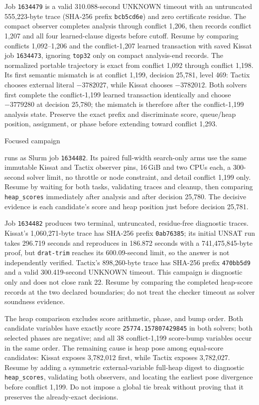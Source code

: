 \documentclass[11pt]{article}
\newcommand{\code}[1]{\texttt{#1}}
\newcommand{\artifact}[1]{\path{#1}}
\begin{document}
Job \code{1634479} is a valid 310.088-second UNKNOWN timeout with an
untruncated 555,223-byte trace (SHA-256 prefix \code{bcb5cd6e}) and zero
certificate residue. The compact observer completes analysis through conflict
1,206, then records conflict 1,207 and all four learned-clause digests before
cutoff. Resume by comparing conflicts 1,092--1,206 and the conflict-1,207
learned transaction with saved Kissat job \code{1634473}, ignoring
\code{top32} only on compact analysis-end records. The normalized portable
trajectory is exact from conflict 1,092 through conflict 1,198. Its first
semantic mismatch is at conflict 1,199, decision 25,781, level 469: Tactix
chooses external literal $-3782027$, while Kissat chooses $-3782012$. Both
solvers first complete the conflict-1,199 learned transaction identically and
choose $-3779280$ at decision 25,780; the mismatch is therefore after the
conflict-1,199 analysis state. Preserve the exact prefix and discriminate
score, queue/heap position, assignment, or phase before extending toward
conflict 1,293.

Focused campaign
\begin{center}\small\artifact{20260819-0640-tierd-rank22-c1199-heap}\end{center}
runs as Slurm job \code{1634482}. Its paired full-width search-only arms use the
same immutable Kissat and Tactix observer pins, 16\,GiB and two CPUs each, a
300-second solver limit, no throttle or node constraint, and detail conflict
1,199 only. Resume by waiting for both tasks, validating traces and cleanup,
then comparing \code{heap\_scores} immediately after analysis and after decision
25,780. The decisive evidence is each candidate's score and heap position just
before decision 25,781.

Job \code{1634482} produces two terminal, untruncated, residue-free diagnostic
traces. Kissat's 1,060,271-byte trace has SHA-256 prefix \code{0ab76385}; its
initial UNSAT run takes 296.719 seconds and reproduces in 186.872 seconds with a
741,475,845-byte proof, but \code{drat-trim} reaches its 600.09-second limit, so
the answer is not independently verified. Tactix's 898,260-byte trace has
SHA-256 prefix \code{470bb5d9} and a valid 300.419-second UNKNOWN timeout. This
campaign is diagnostic only and does not close rank 22. Resume by comparing the
completed heap-score records at the two declared boundaries; do not treat the
checker timeout as solver soundness evidence.

The heap comparison excludes score arithmetic, phase, and bump order. Both
candidate variables have exactly score \code{25774.157807429845} in both
solvers; both selected phases are negative; and all 38 conflict-1,199
score-bump variables occur in the same order. The remaining cause is heap pose
among equal-score candidates: Kissat exposes 3,782,012 first, while Tactix
exposes 3,782,027. Resume by adding a symmetric external-variable full-heap
digest to diagnostic \code{heap\_scores}, validating both observers, and
locating the earliest pose divergence before conflict 1,199. Do not impose a
global tie break without proving that it preserves the already-exact decisions.
\end{document}
